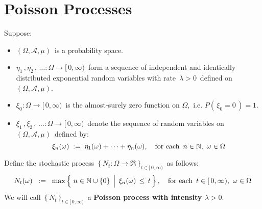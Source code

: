 

\section{Poisson Processes}
\setcounter{theorem}{0}
\setcounter{equation}{0}


\renewcommand{\theenumi}{\roman{enumi}}
\renewcommand{\labelenumi}{\textnormal{(\theenumi)}$\;\;$}


Suppose:
\begin{itemize}
\item
	$(\Omega,\mathcal{A},\mu)$\, is a probability space.
\item
	$\eta_{1}\,, \eta_{2}\,, \,\ldots : \Omega \longrightarrow [\,0,\infty)$\,
	form a sequence of independent and identically distributed
	exponential random variables with rate \,$\lambda > 0$\,
	defined on \,$(\Omega,\mathcal{A},\mu)$.
\item
	$\xi_{0} : \Omega \longrightarrow [\,0,\infty)$\, is the almost-surely zero function on $\Omega$,\,
	i.e. $P(\,\xi_{0} = 0\,) = 1$.
\item
	$\xi_{1}\,, \xi_{2}\,, \,\ldots : \Omega \longrightarrow [\,0,\infty)$\,
	denote the sequence of random variables on
	\,$(\Omega,\mathcal{A},\mu)$\, defined by:
	\begin{equation*}
	\xi_{n}(\omega) \; := \; \eta_{1}(\omega) + \cdots + \eta_{n}(\omega),
	\quad
	\textnormal{for each \,$n \in \mathbb{N}$,\, $\omega \in \Omega$}
	\end{equation*}
\end{itemize}
Define the stochastic process
\,$\{\,N_{t} : \Omega \longrightarrow \Re\,\}_{t\in[\,0,\infty)}$\,
as follows:
\begin{equation*}
N_{t}(\omega)
\;\; := \;\;
	\max\left\{\,\left.
		n \overset{{\color{white}.}}{\in} \N\cup\{0\}
		\,\;\right\vert\;
		\xi_{n}(\omega) \,\leq\, t
		\,\right\},
\quad
\textnormal{for each \,$t \in [\,0,\infty)$,\, $\omega \in \Omega$}
\end{equation*}
We will call \,$\{\,N_{t}\,\}_{t\in[\,0,\infty)}$\, a \textbf{Poisson process with intensity $\lambda > 0$}.


